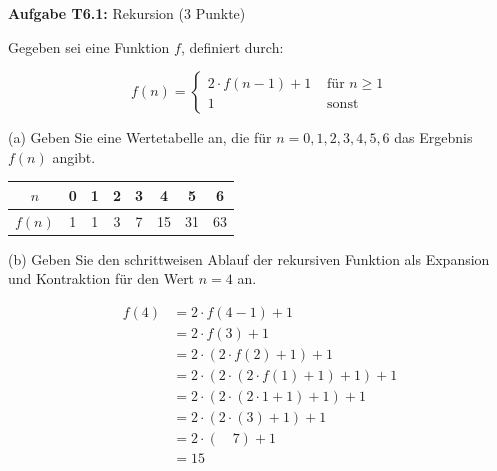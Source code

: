 \RequirePackage{fix-cm}


\newcommand{\obenlinks}{Übungen zur Vorlesung Informatik I}   %




\graphicspath{ {./images/} }

\textbf{Aufgabe T6.1:} Rekursion (3 Punkte)

Gegeben sei eine Funktion $f$, definiert durch:

$$
f(n)= \begin{cases}2 \cdot f(n-1)+1 & \text { für } n \geq 1 \\ 1 & \text { sonst }\end{cases}
$$

(a) Geben Sie eine Wertetabelle an, die für $n=0,1,2,3,4,5,6$ das Ergebnis $f(n)$ angibt.
\begin{center}
  \begin{tabular}{c|c|c|c|c|c|c|c|}
    $n$ & 0 & 1 & 2 & 3 & 4 & 5 & 6 \\
    \hline$f(n)$ & 1 & 1 & 3 & 7 & 15 & 31 & 63
  \end{tabular}
\end{center}


(b) Geben Sie den schrittweisen Ablauf der rekursiven Funktion als Expansion und Kontraktion für den Wert $n=4$ an.

$$
\begin{aligned}
f(4) &=2 \cdot f(4-1)+1 \\
&=2 \cdot f(3)+1 \\
&=2 \cdot(2 \cdot f(2)+1)+1 \\
&=2 \cdot(2 \cdot(2 \cdot f(1)+1)+1)+1\\
&=2 \cdot(2 \cdot(2 \cdot 1+1)+1)+1 \\
&=2 \cdot(2 \cdot(3)+1)+1 \\
&=2 \cdot(\quad 7)+1 \\
&=15
\end{aligned}
$$

